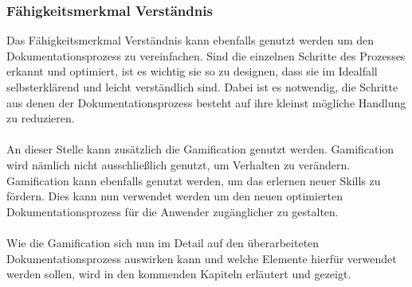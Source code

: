 \documentclass[a4paper,12pt]{scrartcl}
\begin{document}
\subsubsection{Fähigkeitsmerkmal Verständnis}
Das Fähigkeitsmerkmal Verständnis kann ebenfalls genutzt werden um den Dokumentationsprozess zu vereinfachen. Sind die einzelnen Schritte des Prozesses erkannt und optimiert, ist es wichtig sie so zu designen, dass sie im Idealfall selbsterklärend und leicht verständlich sind. Dabei ist es notwendig, die Schritte aus denen der Dokumentationsprozess besteht auf ihre kleinst mögliche Handlung zu reduzieren.
\\\\
An dieser Stelle kann zusätzlich die Gamification genutzt werden. Gamification wird nämlich nicht ausschließlich genutzt, um Verhalten zu verändern. Gamification kann ebenfalls genutzt werden, um das erlernen neuer Skills zu fördern. Dies kann nun verwendet werden um den neuen optimierten Dokumentationsprozess für die Anwender zugänglicher zu gestalten.
\\\\
Wie die Gamification sich nun im Detail auf den überarbeiteten Dokumentationsprozess auswirken kann und welche Elemente hierfür verwendet werden sollen, wird in den kommenden Kapiteln erläutert und gezeigt.
\end{document}
